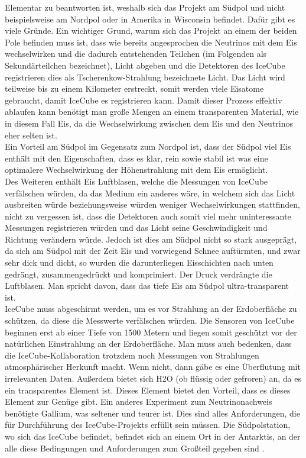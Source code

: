     Elementar zu beantworten ist, weshalb sich das Projekt am Südpol und nicht beispielsweise am 
    Nordpol oder in Amerika in Wisconsin befindet. Dafür gibt es viele Gründe. Ein wichtiger Grund, 
    warum sich das Projekt an einem der beiden Pole befinden muss ist, dass wie bereits angesprochen 
    die Neutrinos mit dem Eis wechselwirken und die dadurch entstehenden Teilchen (im Folgenden als 
    Sekundärteilchen bezeichnet), Licht abgeben und die Detektoren des IceCube registrieren dies als 
    Tscherenkow-Strahlung bezeichnete Licht. Das Licht wird teilweise bis zu einem Kilometer erstreckt, 
    somit werden viele Eisatome gebraucht, damit IceCube es registrieren kann. Damit dieser Prozess effektiv 
    ablaufen kann benötigt man große Mengen an einem transparenten Material, wie in diesem Fall Eis, da die 
    Wechselwirkung zwischen dem Eis und den Neutrinos eher selten ist. \\
    Ein Vorteil am Südpol im Gegensatz zum Nordpol ist, dass der Südpol viel Eis enthält mit den Eigenschaften, 
    dass es klar, rein sowie stabil ist was eine optimalere Wechselwirkung der Höhenstrahlung mit dem Eis 
    ermöglicht. \\
    Des Weiteren enthält Eis Luftblasen, welche die Messungen von IceCube verfälschen würden, 
    da das Medium ein anderes wäre, in welchem sich das Licht ausbreiten würde beziehungsweise würden 
    weniger Wechselwirkungen stattfinden, nicht zu vergessen ist, dass die Detektoren auch somit viel
    mehr uninteressante Messungen registrieren würden und das Licht seine Geschwindigkeit und Richtung 
    verändern würde. Jedoch ist dies am Südpol nicht so stark ausgeprägt, da sich am Südpol mit der Zeit 
    Eis und vorwiegend Schnee auftürmten, und zwar sehr dick und dicht, so wurden die darunterliegen 
    Eisschichten nach unten gedrängt, zusammengedrückt und komprimiert. Der Druck verdrängte die Luftblasen. 
    Man spricht davon, dass das tiefe Eis am Südpol ultra-transparent ist. \\
    IceCube muss abgeschirmt werden, um es vor Strahlung an der Erdoberfläche zu schützen, da diese 
    die Messwerte verfälschen würden. Die Sensoren von IceCube beginnen erst ab einer Tiefe von 1500 
    Metern und liegen somit geschützt vor der natürlichen Einstrahlung an der Erdoberfläche. Man muss 
    auch bedenken, dass die IceCube-Kollaboration trotzdem noch Messungen von Strahlungen atmosphärischer 
    Herkunft macht. Wenn nicht, dann gäbe es eine Überflutung mit irrelevanten Daten. Außerdem bietet 
    sich H2O (ob flüssig oder gefroren) an, da es ein transparentes  Element ist. Dieses Element bietet 
    den Vorteil, dass es dieses Element zur Genüge gibt. Ein anderes Experiment zum Neutrinonachweis 
    benötigte Gallium, was seltener und teurer ist. Dies sind alles Anforderungen, die für Durchführung 
    des IceCube-Projekts erfüllt sein müssen. Die Südpolstation, wo sich das IceCube befindet, befindet 
    sich an einem Ort in der Antarktis, an der alle diese Bedingungen und Anforderungen zum Großteil 
    gegeben sind \cite{FAQ13}.

